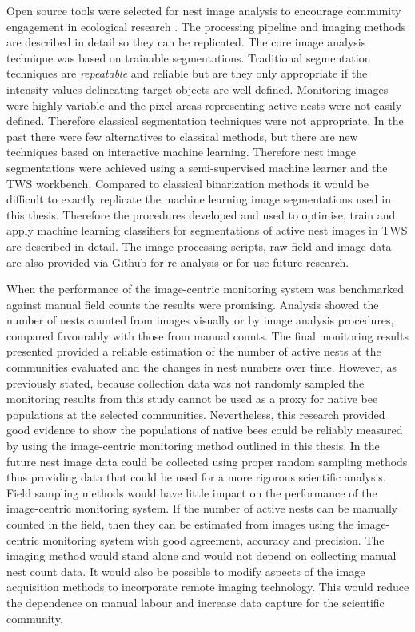 Open source tools were selected for nest image analysis to encourage community engagement in ecological research \cite{Hampton2013}. The processing pipeline and imaging methods are described in detail so they can be replicated. The core image analysis technique was based on trainable segmentations. Traditional segmentation techniques are \emph{repeatable} and reliable but are they only appropriate if the intensity values delineating target objects are well defined. Monitoring images were highly variable and the pixel areas representing active nests were not easily defined. Therefore classical segmentation techniques were not appropriate. In the past there were few alternatives to classical methods, but there are new techniques based on interactive machine learning. Therefore nest image segmentations were achieved using a semi-supervised machine learner and the \ac{TWS} workbench. Compared to classical binarization methods it would be difficult to exactly replicate the machine learning image segmentations used in this thesis. Therefore the procedures developed and used to optimise, train and apply machine learning classifiers for segmentations of active nest images in \ac{TWS} are described in detail. The image processing scripts, raw field and image data are also provided via Github for re-analysis or for use future research.

When the performance of the image-centric monitoring system was benchmarked against manual field counts the results were promising. Analysis showed the number of nests counted from images visually or by image analysis procedures, compared favourably with those from manual counts. The final monitoring results presented provided a reliable estimation of the number of active nests at the communities evaluated and the changes in nest numbers over time. However, as previously stated, because collection data was not randomly sampled the monitoring results from this study cannot be used as a proxy for native bee populations at the selected communities. Nevertheless, this research provided good evidence to show the populations of native bees could be reliably measured by using the image-centric monitoring method outlined in this thesis. In the future nest image data could be collected using proper random sampling methods thus providing data that could be used for a more rigorous scientific analysis. Field sampling methods would have little impact on the performance of the image-centric monitoring system. If the number of active nests can be manually counted in the field, then they can be estimated from images using the image-centric monitoring system with good agreement, accuracy and precision. The imaging method would stand alone and would not depend on collecting manual nest count data. It would also be possible to modify aspects of the image acquisition methods to incorporate remote imaging technology. This would reduce the dependence on manual labour and increase data capture for the scientific community.

